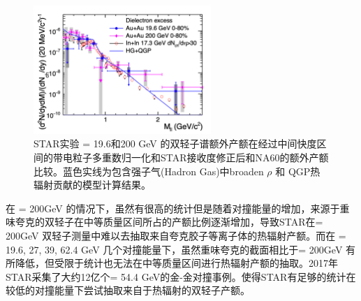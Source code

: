 \begin{figure}[htb]
    \begin{center}
    \includegraphics[width=0.6\textwidth,clip]{figures/Chapter1/STAR19p6.png}
    \end{center}
    \caption[STAR实验 \sNN = 19.6和200 GeV 的双轻子谱额外产额和NA60的额外产额比较]{STAR实验 \sNN = 19.6和200 GeV 的双轻子谱额外产额在经过中间快度区间的带电粒子多重数归一化和STAR接收度修正后和NA60的额外产额比较。蓝色实线为包含强子气(Hadron Gas)中broaden $\rho$ 和 QGP热辐射贡献的模型计算结果。 }
    \label{fig:STAR19p6}
\end{figure}

在 \sNN = 200GeV 的情况下，虽然有很高的统计但是随着对撞能量的增加，来源于重味夸克的双轻子在中等质量区间所占的产额比例逐渐增加，导致STAR在\sNN = 200GeV 双轻子测量中难以去抽取来自夸克胶子等离子体的热辐射产额。而在 \sNN = 19.6, 27, 39, 62.4 GeV 几个对撞能量下，虽然重味夸克的截面相比于\sNN = 200GeV 有所降低，但受限于统计也无法在中等质量区间进行热辐射产额的抽取。2017年STAR采集了大约12亿个\sNN = 54.4 GeV的金-金对撞事例。使得STAR有足够的统计在较低的对撞能量下尝试抽取来自于热辐射的双轻子产额。